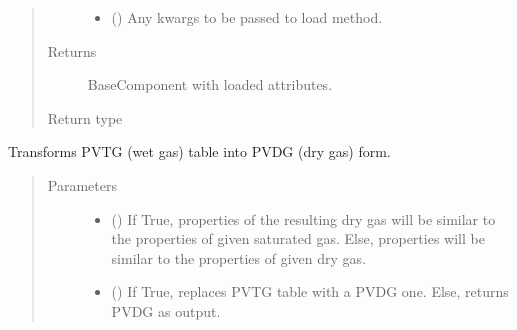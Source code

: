 \documentclass[letterpaper,10pt,english]{sphinxmanual}
\begin{document}
\begin{fulllineitems}
\begin{fulllineitems}
\begin{quote}
\begin{description}
\begin{itemize}
\item {} 
 (\sphinxstyleliteralemphasis{\sphinxupquote{, }}) \textendash{} Any kwargs to be passed to load method.

\end{itemize}

\item[{Returns}] \leavevmode
{} \textendash{} BaseComponent with loaded attributes.

\item[{Return type}] \leavevmode
{\hyperref[\detokenize{api/base_classes:geology.src.base_component.BaseComponent}]{}}

\end{description}\end{quote}

\end{fulllineitems}


\begin{fulllineitems}
\label{\detokenize{api/tables:geology.src.Tables.pvtg_to_pvdg}}
Transforms PVTG (wet gas) table into PVDG (dry gas) form.
\begin{quote}\begin{description}
\item[{Parameters}] \leavevmode\begin{itemize}
\item {} 
 () \textendash{} If True, properties of the resulting dry gas will be similar to the properties of given saturated gas.
Else, properties will be similar to the properties of given dry gas.

\item {} 
 () \textendash{} If True, replaces PVTG table with a PVDG one. Else, returns PVDG as output.


\end{itemize}
\end{description}
\end{quote}
\end{fulllineitems}
\end{fulllineitems}
\end{document}
